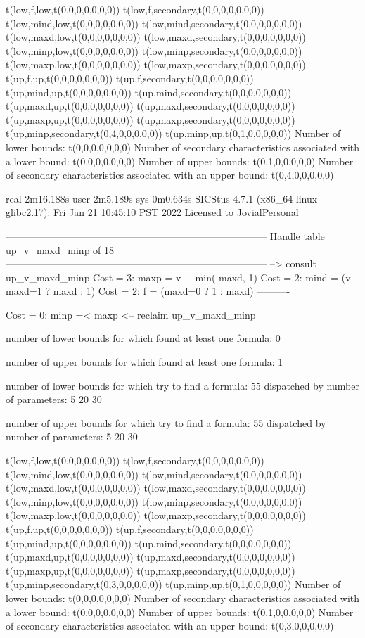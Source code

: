 t(low,f,low,t(0,0,0,0,0,0,0))
t(low,f,secondary,t(0,0,0,0,0,0,0))
t(low,mind,low,t(0,0,0,0,0,0,0))
t(low,mind,secondary,t(0,0,0,0,0,0,0))
t(low,maxd,low,t(0,0,0,0,0,0,0))
t(low,maxd,secondary,t(0,0,0,0,0,0,0))
t(low,minp,low,t(0,0,0,0,0,0,0))
t(low,minp,secondary,t(0,0,0,0,0,0,0))
t(low,maxp,low,t(0,0,0,0,0,0,0))
t(low,maxp,secondary,t(0,0,0,0,0,0,0))
t(up,f,up,t(0,0,0,0,0,0,0))
t(up,f,secondary,t(0,0,0,0,0,0,0))
t(up,mind,up,t(0,0,0,0,0,0,0))
t(up,mind,secondary,t(0,0,0,0,0,0,0))
t(up,maxd,up,t(0,0,0,0,0,0,0))
t(up,maxd,secondary,t(0,0,0,0,0,0,0))
t(up,maxp,up,t(0,0,0,0,0,0,0))
t(up,maxp,secondary,t(0,0,0,0,0,0,0))
t(up,minp,secondary,t(0,4,0,0,0,0,0))
t(up,minp,up,t(0,1,0,0,0,0,0))
Number of lower bounds:                                             t(0,0,0,0,0,0,0)
Number of secondary characteristics associated with a lower bound:  t(0,0,0,0,0,0,0)
Number of upper bounds:                                             t(0,1,0,0,0,0,0)
Number of secondary characteristics associated with an upper bound: t(0,4,0,0,0,0,0)

real	2m16.188s
user	2m5.189s
sys	0m0.634s
SICStus 4.7.1 (x86_64-linux-glibc2.17): Fri Jan 21 10:45:10 PST 2022
Licensed to JovialPersonal


--------------------------------------------------------------------------------
Handle table up_v_maxd_minp of 18
--------------------------------------------------------------------------------
--> consult up_v_maxd_minp
Cost =  3:  maxp = v + min(-maxd,-1) %
Cost =  2:  mind = (v-maxd=1 ? maxd : 1)
Cost =  2:  f    = (maxd=0 ? 1 : maxd)
----------

Cost =  0:  minp =< maxp
<-- reclaim up_v_maxd_minp

number of lower bounds for which found at least one formula: 0

number of upper bounds for which found at least one formula: 1

number of lower bounds for which try to find a formula: 55
dispatched by number of parameters: 5  20  30

number of upper bounds for which try to find a formula: 55
dispatched by number of parameters: 5  20  30

t(low,f,low,t(0,0,0,0,0,0,0))
t(low,f,secondary,t(0,0,0,0,0,0,0))
t(low,mind,low,t(0,0,0,0,0,0,0))
t(low,mind,secondary,t(0,0,0,0,0,0,0))
t(low,maxd,low,t(0,0,0,0,0,0,0))
t(low,maxd,secondary,t(0,0,0,0,0,0,0))
t(low,minp,low,t(0,0,0,0,0,0,0))
t(low,minp,secondary,t(0,0,0,0,0,0,0))
t(low,maxp,low,t(0,0,0,0,0,0,0))
t(low,maxp,secondary,t(0,0,0,0,0,0,0))
t(up,f,up,t(0,0,0,0,0,0,0))
t(up,f,secondary,t(0,0,0,0,0,0,0))
t(up,mind,up,t(0,0,0,0,0,0,0))
t(up,mind,secondary,t(0,0,0,0,0,0,0))
t(up,maxd,up,t(0,0,0,0,0,0,0))
t(up,maxd,secondary,t(0,0,0,0,0,0,0))
t(up,maxp,up,t(0,0,0,0,0,0,0))
t(up,maxp,secondary,t(0,0,0,0,0,0,0))
t(up,minp,secondary,t(0,3,0,0,0,0,0))
t(up,minp,up,t(0,1,0,0,0,0,0))
Number of lower bounds:                                             t(0,0,0,0,0,0,0)
Number of secondary characteristics associated with a lower bound:  t(0,0,0,0,0,0,0)
Number of upper bounds:                                             t(0,1,0,0,0,0,0)
Number of secondary characteristics associated with an upper bound: t(0,3,0,0,0,0,0)

